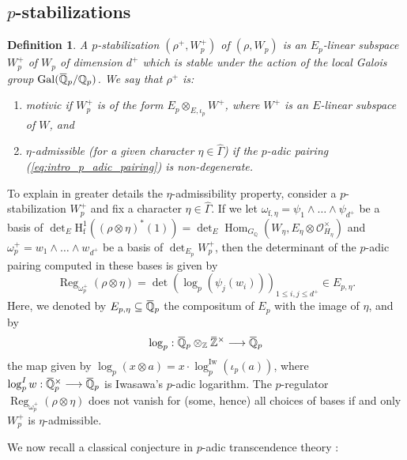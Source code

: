 \documentclass[12pt]{amsart}
\newcommand\bZ{\mathbb{Z}}
\newcommand\bQ{\mathbb{Q}}
\newcommand\Qp{{\mathbb{Q}_p}}
\newcommand\cO{\mathcal{O}}
\newcommand{\ob}[1]{\mkern 1.5mu\overline{\mkern-1.5mu#1\mkern-1.5mu}\mkern 1.5mu}
\DeclareMathOperator{\Gal}{Gal}
\DeclareMathOperator{\Hom}{Hom}
\DeclareMathOperator{\Reg}{Reg}
\newcommand{\HH}{\mathrm{H}}
\newcommand{\ff}{\mathrm{f}}
\theoremstyle{defstyle}
\newtheorem{definition}[subsubsection]{Definition}
\theoremstyle{thmstyle}
\begin{document}
\subsection{$p$-stabilizations} \label{sec:p_stab}
\begin{definition}\label{def:p_stab}
	A \textit{$p$-stabilization} $(\rho^+,W_p^+)$ of $(\rho,W_p)$ is an $E_p$-linear subspace $W_p^+$ of $W_p$ of dimension $d^+$ which is stable under the action of the local Galois group $\Gal(\ob{\bQ}_p/\Qp)$. We say that $\rho^+$ is:
	\begin{enumerate}
		\item \textit{motivic} if $W_p^+$ is of the form $E_p \otimes_{E,\iota_p}W^+$, where $W^+$ is an $E$-linear subspace of $W$, and
		\item $\eta$-\textit{admissible} (for a given character $\eta\in\widehat{\Gamma}$) if the $p$-adic pairing (\ref{eq:intro_p_adic_pairing}) is non-degenerate.
	\end{enumerate} 
\end{definition}
To explain in greater details the $\eta$-admissibility property, consider a $p$-stabilization $W_p^+$ and fix a character $\eta\in\widehat{\Gamma}$. If we let $\omega_{\ff,\eta}=\psi_1\wedge\ldots\wedge\psi_{d^+}$ be a basis of $\det_E \HH^1_\ff((\rho\otimes\eta)^*(1))=\det_E \Hom_{G_{\bQ}}(W_\eta,E_\eta\otimes\cO_{H_\eta}^\times)$ and $\omega_p^+=w_1\wedge\ldots\wedge w_{d^+}$ be a basis of $\det_{E_p} W_p^+$, then the determinant of the $p$-adic pairing computed in these bases is given by 
\begin{equation}\label{eq:expression_reg_p}
\Reg_{\omega_p^+}(\rho\otimes\eta)=\det\left(\log_p(\psi_j(w_i))\right)_{1\leq i,j\leq d^+}\in E_{p,\eta}.
\end{equation}
Here, we denoted by $E_{p,\eta}\subseteq\ob{\bQ}_p$ the compositum of $E_p$ with the image of $\eta$, and by
\begin{equation}\label{eq:def_log_p}
\log_p : \ob{\bQ}_p \otimes_{\bZ} \ob{\bZ}^\times \longrightarrow \ob{\bQ}_p
\end{equation}
the map given by $\log_p(x\otimes a)=x\cdot \log_p^\textrm{Iw}(\iota_p(a))$, where $\log_p^\textrm{Iw}:\ob{\bQ}^\times_p\longrightarrow\ob{\bQ}_p$ is Iwasawa's $p$-adic logarithm. The $p$-regulator $\Reg_{\omega_p^+}(\rho\otimes\eta)$ does not vanish for (some, hence) all choices of bases if and only $W_p^+$ is $\eta$-admissible. 

We now recall a classical conjecture in $p$-adic transcendence theory \cite[Conjecture 3.10]{mazurcalegari}:
\end{document}
